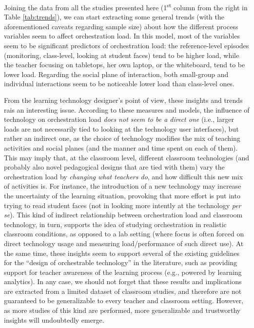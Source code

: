 \documentclass[10pt,journal,compsoc]{IEEEtran}
\begin{document}
Joining the data from all the studies presented here (1\textsuperscript{st} column from the right in Table \ref{tab:trends}), we can start extracting some general trends (with the aforementioned caveats regarding sample size) about how the different process variables seem to affect orchestration load. In this model, most of the variables seem to be significant predictors of orchestration load: the reference-level episodes (monitoring, class-level, looking at student faces) tend to be higher load, while the teacher focusing on tabletops, her own laptop, or the whiteboard, tend to be lower load. Regarding the social plane of interaction, both small-group and individual interactions seem to be noticeable lower load than class-level ones.

From the learning technology designer's point of view, these insights and trends rais an interesting issue. According to these measures and models, the influence of technology on orchestration load \textit{does not seem to be a direct one} (i.e., larger loads are not necessarily tied to looking at the technology user interfaces), but rather an indirect one, as the choice of technology modifies the mix of teaching activities and social planes (and the manner and time spent on each of them). This may imply that, at the classroom level, different classroom technologies (and probably also novel pedagogical designs that are tied with them) vary the orchestration load by \textit{changing what teachers do}, and how difficult this new mix of activities is. For instance, the introduction of a new technology may increase the uncertainty of the learning situation, provoking that more effort is put into trying to read student faces (not in looking more intently at the technology \textit{per se}). This kind of indirect relationship between orchestration load and classroom technology, in turn, supports the idea of studying orchestration in realistic classroom conditions, as opposed to a lab setting (where focus is often forced on direct technology usage and measuring load/performance of such direct use). At the same time, these insights seem to support several of the existing guidelines for the ``design of orchestrable technology'' in the literature, such as providing support for teacher awareness of the learning process \cite{dillenbourg2013design} (e.g., powered by learning analytics). In any case, we should not forget that these results and implications are extracted from a limited dataset of classroom studies, and therefore are not guaranteed to be generalizable to every teacher and classroom setting. However, as more studies of this kind are performed, more generalizable and trustworthy insights will undoubtedly emerge.
\end{document}
